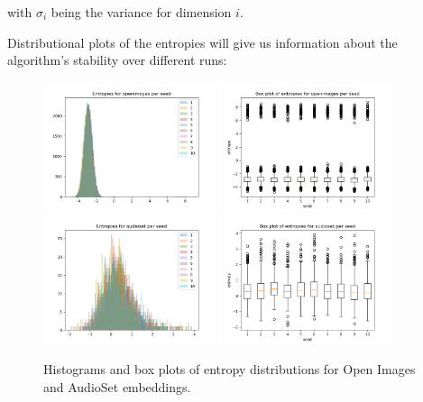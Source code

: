 with $\sigma_i$ being the variance for dimension $i$. 
 
Distributional plots of the entropies will give us information about the algorithm's stability over different runs:

\begin{figure}[H]
\label{fig:entropyindependent}
    \centering
    \includegraphics[width=0.45\textwidth]{images/method/probabilistic_independent/openimages_entropies.png}
    \includegraphics[width=0.45\textwidth]{images/method/probabilistic_independent/openimages_entropies_box.png}
    \includegraphics[width=0.45\textwidth]{images/method/probabilistic_independent/audioset_entropies.png}
    \includegraphics[width=0.45\textwidth]{images/method/probabilistic_independent/audioset_entropies_box.png}
    \caption{
        Histograms and box plots of entropy distributions for Open Images and AudioSet embeddings. 
    }
\end{figure}
 
